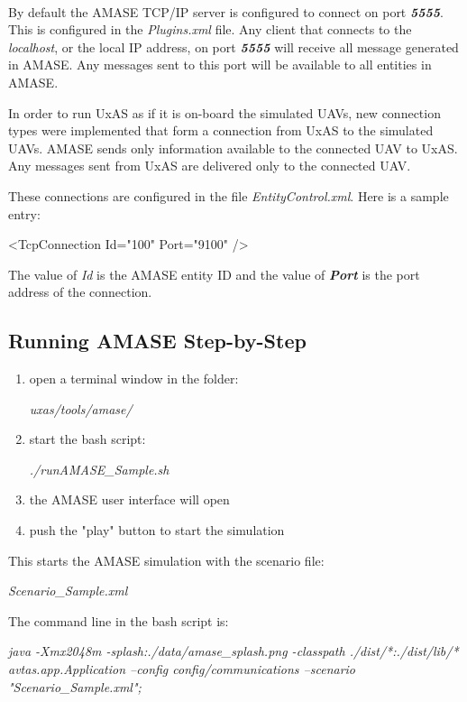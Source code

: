 \\
By default the AMASE TCP/IP server is configured to connect on port \textbf{\textit{5555}}. This is configured in the \textit{Plugins.xml} file. Any client that connects to the \textit{localhost}, or the local IP address, on port \textbf{\textit{5555}} will receive all message generated in AMASE. Any messages sent to this port will be available to all entities in AMASE.

In order to run UxAS as if it is on-board the simulated UAVs, new connection types were implemented that form a connection from UxAS to the simulated UAVs. AMASE sends only information available to the connected UAV to UxAS. Any messages sent from UxAS are delivered only to the connected UAV.

These connections are configured in the file \textit{EntityControl.xml}. Here is a sample entry:
\begin{docspec}
<TcpConnection Id="100" Port="9100" />
\end{docspec}
The value of \textit{\textit{Id}} is the AMASE entity ID and the value of \textbf{\textit{Port}} is the port address of the connection.





\subsection{Running AMASE Step-by-Step}
\begin{enumerate}
\item open a terminal window in the folder:
\begin{docspec}
    \textit{uxas/tools/amase/}
\end{docspec}
\item start the bash script:
\begin{docspec}
    \textit{./runAMASE\_Sample.sh}
\end{docspec}
\item the AMASE user interface will open
\item push the "play" button to start the simulation
\end{enumerate}
This starts the AMASE simulation with the scenario file:
\begin{docspec}
    \textit{Scenario\_Sample.xml}
\end{docspec}
The command line in the bash script is:
\begin{docspec}
\textit{java -Xmx2048m -splash:./data/amase\_splash.png -classpath ./dist/*:./dist/lib/*  avtas.app.Application --config config/communications --scenario "Scenario\_Sample.xml";}
\end{docspec}

